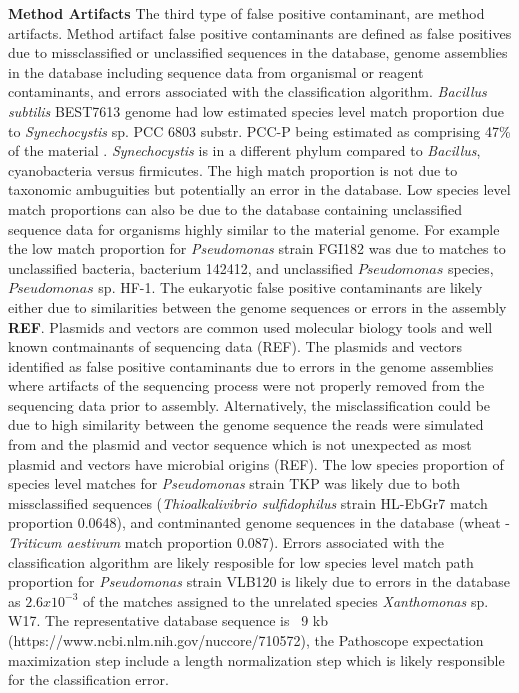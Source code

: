 \documentclass[fleqn,10pt,lineno]{wlpeerj}\usepackage[]{graphicx}\usepackage[]{color}
\begin{document}
\textbf{Method Artifacts}
The third type of false positive contaminant, are method artifacts. Method artifact false positive contaminants are defined as false positives due to missclassified or unclassified sequences in the database, genome assemblies in the database including sequence data from organismal or reagent contaminants, and errors associated with the classification algorithm. 
\textit{Bacillus subtilis} BEST7613 genome had low estimated species level match proportion due to \textit{Synechocystis} sp. PCC 6803 substr. PCC-P being estimated as comprising 47\% of the material  \citep{kanesaki2012identification}. \textit{Synechocystis} is in a different phylum compared to \textit{Bacillus}, cyanobacteria versus firmicutes. 
The high match proportion is not due to taxonomic ambuguities but potentially an error in the database. 
Low species level match proportions can also be due to the database containing unclassified sequence data for organisms highly similar to the material genome. 
For example the low match proportion for \textit{Pseudomonas} strain FGI182 was due to matches to unclassified bacteria, bacterium 142412, and unclassified $Pseudomonas$ species, $Pseudomonas$ sp. HF-1.  
The eukaryotic false positive contaminants are likely either due to similarities between the genome sequences or errors in the assembly \textbf{REF}. 
Plasmids and vectors are common used molecular biology tools and well known contmainants of sequencing data (REF).
The plasmids and vectors identified as false positive contaminants due to errors in the genome assemblies where artifacts of the sequencing process were not properly removed from the sequencing data prior to assembly. 
Alternatively, the misclassification could be due to high similarity between the genome sequence the reads were simulated from and the plasmid and vector sequence which is not unexpected as most plasmid and vectors have microbial origins (REF). 
The low species proportion of species level matches for \textit{Pseudomonas} strain TKP was likely due to both missclassified sequences (\textit{Thioalkalivibrio sulfidophilus} strain HL-EbGr7 match proportion 0.0648), and contminanted genome sequences in the database (wheat - \textit{Triticum aestivum} match proportion 0.087).
Errors associated with the classification algorithm are likely resposible for low species level match path proportion for \textit{Pseudomonas} strain VLB120 is likely due to errors in the database as $2.6x10^{-3}$ of the matches assigned to the unrelated species \textit{Xanthomonas} sp. W17. 
The representative database sequence is ~9 kb (https://www.ncbi.nlm.nih.gov/nuccore/710572), the Pathoscope expectation maximization step include a length normalization step which is likely responsible for the classification error. 
\end{document}
